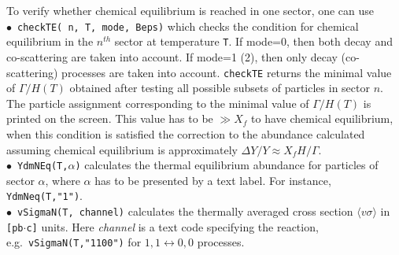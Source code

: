 \documentclass[12pt,a4paper]{article}
\begin{document}
To verify whether  chemical equilibrium is reached in one sector, one can use \\                
 $\bullet$~\verb|checkTE( n, T, mode, Beps)|  which  checks the condition for chemical equilibrium  in the $n^{th}$  sector at temperature \verb|T|.
     If mode=0, then both decay and  co-scattering are taken into account. If mode=1 (2),  then only decay (co-scattering) processes are taken
       into account.  \verb|checkTE|  returns  the minimal value of $\Gamma/H(T)$ obtained after testing all possible subsets of particles in sector $n$. The particle assignment corresponding to the minimal value of $\Gamma/H(T)$  is printed on the screen. This value has to be $\gg X_f$ to have chemical equilibrium, when this condition is satisfied  
        the correction to the abundance calculated assuming chemical equilibrium is approximately 
       $\Delta Y/Y\approx X_f H/ \Gamma$.    \\
 $\bullet$~\verb|YdmNEq(T,|$\alpha${\tt)}  calculates the thermal equilibrium 
abundance %
for particles of sector $\alpha$, where $\alpha$  has to be presented by a text label. For instance, {\tt YdmNeq(T,"1")}.
\\
$\bullet$~\verb|vSigmaN(T, channel)|  calculates %
the thermally averaged  cross section  $\langle v\sigma \rangle$  in  {\tt [pb$\cdot$c]} units.  
Here {\it channel } is a  text code specifying the reaction, e.g.\ \verb|vSigmaN(T,"1100")| 
for $1,1 \leftrightarrow 0,0$ processes.  


\end{document}
